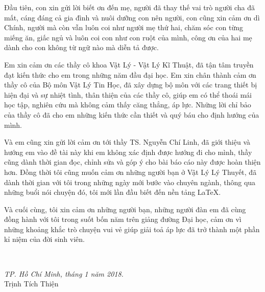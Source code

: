 Đầu tiên, con xin gửi lời biết ơn đến mẹ, người đã thay thế vai trò người cha đã mất, cáng đáng cả gia đình và nuôi
dưỡng con nên người, con cũng xin cảm ơn dì Chính, người mà còn vẫn luôn coi như người mẹ thứ hai, chăm sóc con từng
miếng ăn, giấc ngủ và luôn coi con như con ruột của mình, công ơn của hai mẹ dành cho con không từ ngữ nào mà diễn tả được.\par
Em xin cảm ơn các thầy cô khoa Vật Lý - Vật Lý Kĩ Thuật, đã tận tâm truyền đạt kiến thức cho em trong những năm đầu đại học.
Em xin chân thành cảm ơn thầy cô của Bộ môn Vật Lý Tin Học, đã xây dựng bộ môn với các trang thiết bị hiện đại và sự nhiệt
tình, thân thiện của các thầy cô, giúp em có thể thoái mái học tập, nghiên cứu mà không cảm thấy căng thẳng, áp lực. 
Những lời chỉ bảo của thầy cô đã cho em những kiến thức cần thiết và quý báu cho định hướng của mình.\par
Và em cũng xin gửi lời cảm ơn tới thầy TS. Nguyễn Chí Linh, đã giới thiệu và hướng em vào đề tài này khi em không xác định
được hướng đi cho mình, thầy cũng dành thời gian đọc, chỉnh sửa và góp ý cho bài báo cáo này được hoàn thiện hơn. Đồng thời
tôi cũng muốn cảm ơn những người bạn ở Vật Lý Lý Thuyết, đã dành thời gian với tôi trong những ngày mới bước vào chuyên ngành,
thông qua những buổi nói chuyện đó, tôi mới lần đầu biết đến nền tảng LaTeX.\par
Và cuối cùng, tôi xin cảm ơn những người bạn, những người đàn em đã cùng đồng hành với tôi trong suốt bốn năm trên giảng
đường Đại học, cảm ơn vì những khoảng khắc trò chuyện vui vẻ giúp giải toả áp lực đã trở thành một phần kỉ niệm của đời sinh viên.\par~\par
\hfill
\begin{minipage}[H]{0.5\textwidth}
 \centering
 \textsl{TP. Hồ Chí Minh, tháng 1 năm 2018.}\\
 \vspace{1cm}
 Trịnh Tích Thiện 
\end{minipage}

